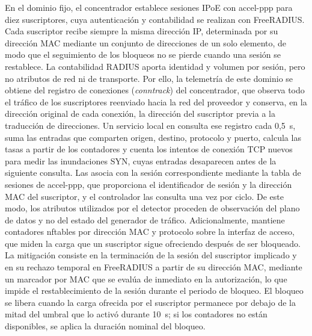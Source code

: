 En el dominio fijo, el concentrador  establece sesiones IPoE con accel-ppp para diez suscriptores, cuya autenticación y contabilidad se realizan con FreeRADIUS. Cada suscriptor recibe siempre la misma dirección IP, determinada por su dirección MAC mediante un conjunto de direcciones de un solo elemento, de modo que el seguimiento de los bloqueos no se pierde cuando una sesión se restablece. La contabilidad RADIUS aporta identidad y volumen por sesión, pero no atributos de red ni de transporte. Por ello, la telemetría de este dominio se obtiene del registro de conexiones (\textit{conntrack}) del concentrador, que observa todo el tráfico de los suscriptores reenviado hacia la red del proveedor y conserva, en la dirección original de cada conexión, la dirección del suscriptor previa a la traducción de direcciones. Un servicio local en  consulta ese registro cada 0,5~s, suma las entradas que comparten origen, destino, protocolo y puerto, calcula las tasas a partir de los contadores y cuenta los intentos de conexión TCP nuevos para medir las inundaciones SYN, cuyas entradas desaparecen antes de la siguiente consulta. Las asocia con la sesión correspondiente mediante la tabla de sesiones de accel-ppp, que proporciona el identificador de sesión y la dirección MAC del suscriptor, y el controlador las consulta una vez por ciclo. De este modo, los atributos utilizados por el detector proceden de observación del plano de datos y no del estado del generador de tráfico. Adicionalmente,  mantiene contadores nftables por dirección MAC y protocolo sobre la interfaz de acceso, que miden la carga que un suscriptor sigue ofreciendo después de ser bloqueado. La mitigación consiste en la terminación de la sesión del suscriptor implicado y en su rechazo temporal en FreeRADIUS a partir de su dirección MAC, mediante un marcador por MAC que se evalúa de inmediato en la autorización, lo que impide el restablecimiento de la sesión durante el periodo de bloqueo. El bloqueo se libera cuando la carga ofrecida por el suscriptor permanece por debajo de la mitad del umbral que lo activó durante 10~s; si los contadores no están disponibles, se aplica la duración nominal del bloqueo.

